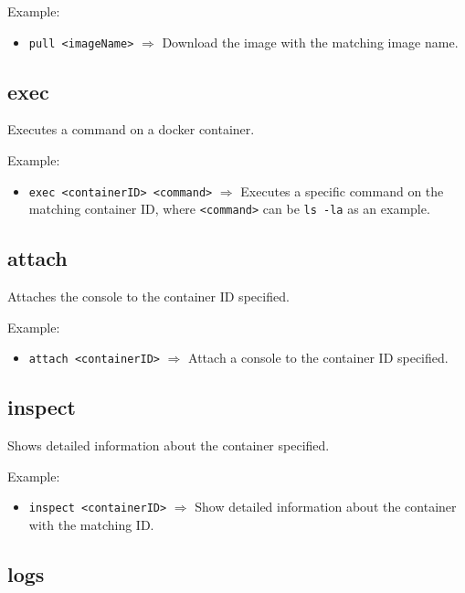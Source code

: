 \documentclass[a4paper, 12pt]{article}
\begin{document}
\vspace{0.5em}
Example:
\begin{itemize}
	\item \texttt{pull <imageName>} $\Rightarrow$ Download the image with the
	matching image name.
\end{itemize}

\subsection{exec}

Executes a command on a docker container.

\vspace{0.5em}
Example:
\begin{itemize}
	\item \texttt{exec <containerID> <command>} $\Rightarrow$ Executes a
	specific command on the matching container ID, where \texttt{<command>} can
	be \texttt{ls -la} as an example.
\end{itemize}

\subsection{\label{sec:attach}attach}

Attaches the console to the container ID specified.

\vspace{0.5em}
Example:
\begin{itemize}
	\item \texttt{attach <containerID>} $\Rightarrow$ Attach a console to the
	container ID specified.
\end{itemize}

\subsection{inspect}

Shows detailed information about the container specified.

\vspace{0.5em}
Example:
\begin{itemize}
	\item \texttt{inspect <containerID>} $\Rightarrow$ Show detailed information
	about the container with the matching ID.
\end{itemize}

\subsection{logs}
\end{document}
